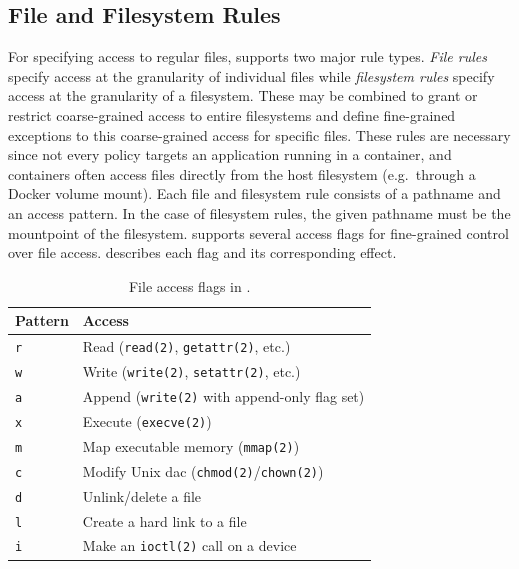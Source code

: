 \subsection{File and Filesystem Rules}

For specifying access to regular files, \bpfcontain{} supports two major rule types.
\textit{File rules} specify access at the granularity of individual files while
\textit{filesystem rules} specify access at the granularity of a filesystem.  These may be
combined to grant or restrict coarse-grained access to entire filesystems and define
fine-grained exceptions to this coarse-grained access for specific files. These rules are
necessary since not every \bpfcontain{} policy targets an application running in
a container, and containers often access files directly from the host filesystem
(e.g.~through a Docker volume mount). Each file and filesystem rule consists of a pathname
and an access pattern. In the case of filesystem rules, the given pathname must be the
mountpoint of the filesystem. \bpfcontain{} supports several access flags for fine-grained
control over file access.  describes each flag and its
corresponding effect.

\begin{table}[htbp]
  \centering
  \caption[File access flags in \bpfcontain{}]{
    File access flags in \bpfcontain{}.
  }%
  \label{tab:bpfcontain-file-access}
  \begin{tabular}{ll}
  \toprule
  Pattern & Access \\
  \midrule
  \texttt{r} & Read (\texttt{read(2)}, \texttt{getattr(2)}, etc.) \\
  \texttt{w} & Write (\texttt{write(2)}, \texttt{setattr(2)}, etc.)\\
  \texttt{a} & Append (\texttt{write(2)} with append-only flag set) \\
  \texttt{x} & Execute (\texttt{execve(2)})\\
  \texttt{m} & Map executable memory (\texttt{mmap(2)}) \\
  \texttt{c} & Modify Unix \gls{dac} (\texttt{chmod(2)}/\texttt{chown(2)}) \\
  \texttt{d} & Unlink/delete a file \\
  \texttt{l} & Create a hard link to a file \\
  \texttt{i} & Make an \texttt{ioctl(2)} call on a device \\
  \bottomrule
  \end{tabular}
\end{table}

